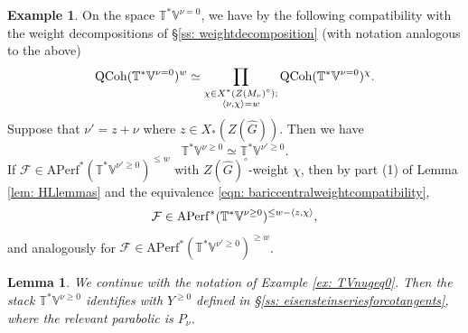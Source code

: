 \documentclass{amsart}
\newtheorem{lemma}[theorem]{Lemma}
\theoremstyle{definition}
\newtheorem{example}[theorem]{Example}
\theoremstyle{remark}
\numberwithin{equation}{section}
\newcommand{\mc}{\mathcal}
\newcommand{\wh}{\widehat}
\newcommand{\QCoh}{\mathrm{QCoh}}
\newcommand{\V}{\mathbb{V}}
\newcommand{\T}{\mathbb{T}}
\newcommand{\Aperf}{\mathrm{APerf}}
\begin{document}
\begin{example}{\label{ex: TVnugeq0}}
    On the space $\T^{\ast} \V^{\nu = 0}$, we have by \cite[Lemma 1.5.3]{HalpernLeistner} the following compatibility with the weight decompositions of \S \ref{ss: weightdecomposition} (with notation analogous to the above)
    \begin{equation}{\label{eqn: bariccentralweightcompatibility}}
\QCoh(\T^{\ast}\V^{\nu=0})^w \simeq  \prod_{\substack{\chi \in X^{\ast}(Z(M_{\nu})^{\circ});\\ \langle \nu, \chi \rangle = w}}\QCoh(\T^{\ast}\V^{\nu=0})^{\chi}.
    \end{equation}
    Suppose that $\nu' = z + \nu$ where $z \in X_{\ast}(Z(\wh{G}))$. Then we have 
    \begin{equation*}
        \T^{\ast}\V^{\nu \geq 0} \simeq \T^{\ast}\V^{\nu' \geq 0}.
    \end{equation*}
    If $\mc{F} \in \Aperf^*(\T^{\ast}\V^{\nu' \geq 0})^{\leq w}$ with $Z(\wh G)^\circ$-weight $\chi$, then by part (1) of Lemma \ref{lem: HLlemmas} and the equivalence \eqref{eqn: bariccentralweightcompatibility},
    \begin{equation}{\label{eqn: basiccentralshift}}
        \mc{F} \in \Aperf^*(\T^{\ast}\V^{\nu \geq 0})^{\leq w - \langle z, \chi \rangle},
    \end{equation}
    and analogously for $\mc{F} \in \Aperf^*(\T^{\ast}\V^{\nu' \geq 0})^{\geq w}$.
\end{example}
\begin{lemma}{\label{lem: eiscotanfiberprodcomparison}}
    We continue with the notation of Example \ref{ex: TVnugeq0}. Then the stack $\T^{\ast}\V^{\nu \geq 0}$ identifies with $Y^{\geq 0}$ defined in \S\ref{ss: eisensteinseriesforcotangents}, where the relevant parabolic is $P_\nu$. 
\end{lemma}
\end{document}
